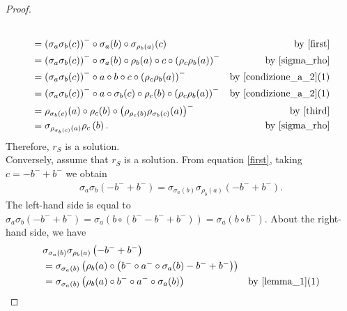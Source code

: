 \documentclass[preprint,1p]{elsarticle}
\theoremstyle{definition}               %
\begin{document}
\begin{proof}
\begin{align*}
    \\&=\left(\sigma_{a}\sigma_b(c)\right)^- \circ \sigma_a(b)\circ \sigma_{\rho_b(a)}(c) &\mbox{by \eqref{first}}\\
    &=\left(\sigma_{a}\sigma_b(c)\right)^- \circ \sigma_a(b)\circ \rho_b(a)\circ c \circ\left(\rho_c\rho_b(a)\right)^-  &\mbox{by \cref{sigma_rho}}\\
    &=\left(\sigma_{a}\sigma_b(c)\right)^- \circ a \circ b \circ c \circ \left(\rho_c\rho_b(a)\right)^-  &\mbox{by \cref{condizione_a_2}(1)}\\
    &=\left(\sigma_{a}\sigma_b(c)\right)^- \circ a \circ \sigma_b(c) \circ \rho_c(b) \circ \left(\rho_c \rho_b(a)   \right)^-&\mbox{by \cref{condizione_a_2}(1)}\\
    &=\rho_{\sigma_b(c)}(a) \circ \rho_c(b) \circ \left(\rho_{\rho_c(b)}\rho_{\sigma_b(c)}(a)\right)^-&\mbox{by \eqref{third}}\\
&=\sigma_{\rho_{\sigma_b\left(c\right)}\left(a\right)}\rho_c\left(b\right). &\mbox{by \cref{sigma_rho}}
\end{align*}
Therefore, $r_S$ is a solution.\\
Conversely, assume that $r_S$ is a solution. From equation \eqref{first}, taking $c=-b^-+b^-$ we obtain
   \begin{align*}
\sigma_a\sigma_b\left(-b^-+b^-\right)=\sigma_{\sigma_a\left(b\right)}\sigma_{\rho_b\left(a\right)}\left(-b^-+b^-\right).  
   \end{align*}
   The left-hand side is equal to $
  \sigma_a\sigma_b\left(-b^-+b^-\right)=\sigma_a\left(b \circ \left( b^--b^-+b^-\right)\right)=\sigma_a\left(b \circ b^- \right)$. About the right-hand side, we have
  \begin{align*}
&\sigma_{\sigma_a\left(b\right)}\sigma_{\rho_b\left(a\right)}\left(-b^-+b^-\right)\\
   &=\sigma_{\sigma_a\left(b\right)}\left(\rho_b(a) \circ \left(b^- \circ a^- \circ \sigma_a(b)-b^-+b^-\right)\right)\\
   &=\sigma_{\sigma_a\left(b\right)}\left(\rho_b(a) \circ b^- \circ a^- \circ \sigma_a(b)\right) &\mbox{by \cref{lemma_1}(1)}\\

\end{align*}
\end{proof}
\end{document}
